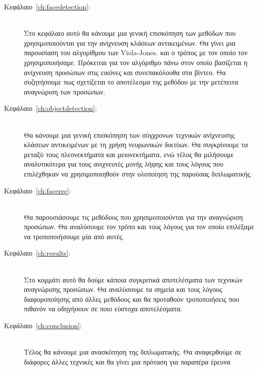 \begin{description}
  \item[Κεφάλαιο~\ref{ch:facedetection}:] \hfill \\
    Στο κεφάλαιο αυτό θα κάνουμε μια γενική επισκόπηση των μεθόδων που
    χρησιμοποιούνται για την ανίχνευση κλάσεων αντικειμένων.
    Θα γίνει μια παρουσίαση του αλγορίθμου των Viola-Jones.
    και ο τρόπος με τον οποίο τον χρησιμοποιήσαμε. Πρόκειται για τον αλγόριθμο
    πάνω στον οποίο βασίζεται η ανίχνευση προσώπων στις εικόνες και συνεπακόλουθα
    στα βίντεο. Θα συζητήσουμε πως σχετίζεται το αποτέλεσμα της μεθόδου με
    την μετέπειτα αναγνώριση των προσώπων.
  \item[Κεφάλαιο~\ref{ch:objectdetection}:] \hfill \\
    Θα κάνουμε μια γενική επισκόπηση των σύγχρονων τεχνικών ανίχνευσης κλάσεων αντικειμένων
    με τη χρήση νευρωνικών δικτύων. Θα συγκρίνουμε τα μεταξύ τους πλεονεκτήματα
    και μειονεκτήματα, ενώ τέλος θα μιλήσουμε αναλυτικότερα για τους ανιχνευτές μονής
    λήψης και τους λόγους που επιλέχθηκαν να χρησιμοποιηθούν στην υλοποίηση της
    παρούσας διπλωματικής.
  \item[Κεφάλαιο~\ref{ch:facerec}:] \hfill \\
    Θα παρουσιάσουμε τις μεθόδους που χρησιμοποιούνται για την
    αναγνώριση προσώπων. Θα αναλύσουμε τον τρόπο και τους λόγους για τον οποίο
    επιλέξαμε να τροποποιήσουμε μία από αυτές.
  \item[Κεφάλαιο~\ref{ch:results}:] \hfill \\
    Στο κομμάτι αυτό θα δούμε κάποια συγκριτικά αποτελέσματα των τεχνικών
    αναγνώρισης προσώπων. Θα αναλύσουμε τα σημεία και τους λόγους διαφοροποίησης
    από άλλες μεθόδους και θα προταθούν τροποποιήσεις που πιθανόν να οδηγήσουν
    σε ποιο εύστοχα αποτελέσματα.
  \item[Κεφάλαιο~\ref{ch:conclusion}:] \hfill \\
    Τέλος θα κάνουμε μια ανασκόπηση της διπλωματικής. Θα αναφερθούμε σε διάφορες
    άλλες τεχνικές και θα γίνει μια πρόταση για παραπέρα έρευνα
\end{description}
